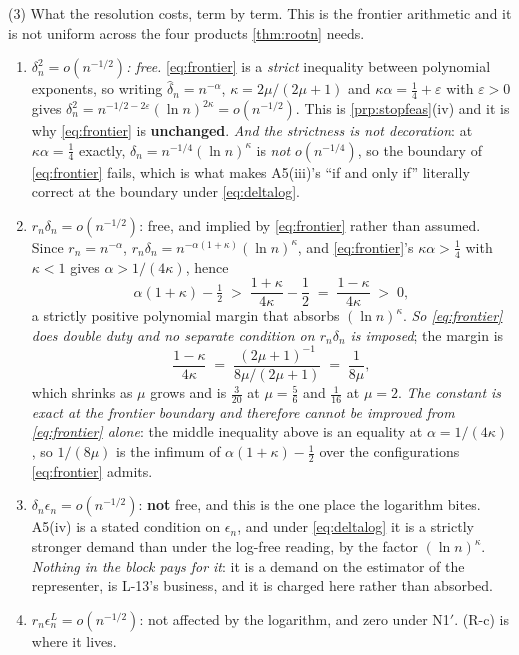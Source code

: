 \begin{remark}
(3) What the resolution costs, term by term. This is the frontier arithmetic and it is not uniform
across the four products \cref{thm:rootn} needs.
\begin{enumerate}
\item[(a)] \emph{$\delta_n^{2}=o(n^{-1/2})$: free.} \eqref{eq:frontier} is a \emph{strict} inequality
between polynomial exponents, so writing $\hat\delta_n=n^{-\alpha}$, $\kappa=2\mu/(2\mu+1)$ and
$\kappa\alpha=\tfrac14+\varepsilon$ with $\varepsilon>0$ gives
$\delta_n^{2}=n^{-1/2-2\varepsilon}(\ln n)^{2\kappa}=o(n^{-1/2})$. This is
\cref{prp:stopfeas}\textup{(iv)} and it is why \eqref{eq:frontier} is \textbf{unchanged}.
\emph{And the strictness is not decoration}: at $\kappa\alpha=\tfrac14$ exactly,
$\delta_n=n^{-1/4}(\ln n)^{\kappa}$ is \emph{not} $o(n^{-1/4})$, so the boundary of \eqref{eq:frontier}
fails, which is what makes A5(iii)'s ``if and only if'' literally correct at the boundary
under \eqref{eq:deltalog}.
\item[(b)] $r_n\delta_n=o(n^{-1/2})$: free, and implied by \eqref{eq:frontier} rather than assumed.
Since $r_n=n^{-\alpha}$, $r_n\delta_n=n^{-\alpha(1+\kappa)}(\ln n)^{\kappa}$, and \eqref{eq:frontier}'s
$\kappa\alpha>\tfrac14$ with $\kappa<1$ gives $\alpha>1/(4\kappa)$, hence
\[
\alpha(1+\kappa)-\tfrac12\;>\;\frac{1+\kappa}{4\kappa}-\frac12\;=\;\frac{1-\kappa}{4\kappa}\;>\;0 ,
\]
a strictly positive polynomial margin that absorbs $(\ln n)^{\kappa}$. \emph{So \eqref{eq:frontier} does
double duty and no separate condition on $r_n\delta_n$ is imposed}; the margin is
\begin{equation}\label{eq:rndeltamargin}
\frac{1-\kappa}{4\kappa}\;=\;\frac{(2\mu+1)^{-1}}{8\mu/(2\mu+1)}\;=\;\frac1{8\mu} ,
\end{equation}
which shrinks as $\mu$ grows and is $\tfrac3{20}$ at $\mu=\tfrac56$ and $\tfrac1{16}$ at $\mu=2$.
\emph{The constant is exact at the frontier boundary and therefore cannot be improved from
\eqref{eq:frontier} alone}: the middle inequality above is an equality at $\alpha=1/(4\kappa)$, so
$1/(8\mu)$ is the infimum of $\alpha(1+\kappa)-\tfrac12$ over the configurations \eqref{eq:frontier}
admits.
\item[(c)] $\delta_n\epsilon_n=o(n^{-1/2})$: \textbf{not} free, and this is the one place the
logarithm bites. A5(iv) is a stated condition on $\epsilon_n$, and under
\eqref{eq:deltalog} it is a strictly stronger demand than under the log-free reading, by the factor
$(\ln n)^{\kappa}$. \emph{Nothing in the block pays for it}: it is a demand on the estimator of the
representer, is L-13's business, and it is charged here rather than absorbed.
\item[(d)] $r_n\epsilon^{L}_n=o(n^{-1/2})$: not affected by the logarithm, and zero under N1$'$.
(R-c) is where it lives.
\end{enumerate}


\end{remark}
